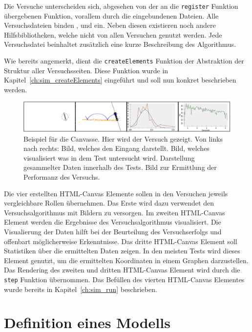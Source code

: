 Die Versuche unterscheiden sich, abgesehen von der an die \lstinline{register} Funktion übergebenen Funktion, vorallem durch die eingebundenen Dateien.
Alle Versuchsdateien binden ,  und  ein.
Neben diesen existieren noch andere Hilfsbibliotheken, welche nicht von allen Versuchen genutzt werden.
Jede Versuchsdatei beinhaltet zusätzlich eine kurze Beschreibung des Algorithmus.

Wie bereits angemerkt, dient die \lstinline{createElements} Funktion der Abstraktion der Struktur aller Versuchsseiten.
Diese Funktion wurde in Kapitel~\ref{ch:sim_createElements} eingeführt und soll nun konkret beschrieben werden.

\begin{figure}
    \includegraphics[width=\textwidth]{gfx/canvasses.png}
    \caption[Bild der Canvasse]{Beispiel für die Canvasse. Hier wird der Versuch  gezeigt. Von links nach rechts: Bild, welches den Eingang darstellt. Bild, welches visualisiert was in dem Test untersucht wird. Darstellung gesammelter Daten innerhalb des Tests. Bild zur Ermittlung der Performanz des Versuchs.}\label{fig:canvasses}
\end{figure}

Die vier erstellten HTML-Canvas Elemente sollen in den Versuchen jeweils vergleichbare Rollen übernehmen.
Das Erste wird dazu verwendet den Versuchsalgorithmus mit Bildern zu versorgen.
Im zweiten HTML-Canvas Element werden die Ergebnisse des Versuchsalgorithmus visualisiert.
Die Visualierung der Daten hilft bei der Beurteilung des Versuchserfolgs und offenbart möglicherweise Erkenntnisse.
Das dritte HTML-Canvas Element soll Statistiken über die ermittelten Daten zeigen.
In den meisten Tests wird dieses Element genutzt, um die ermittelten Koordinaten in einem Graphen darzustellen.
Das Rendering des zweiten und dritten HTML-Canvas Element wird durch die \lstinline{step} Funktion übernommen.
Das Befüllen des vierten HTML-Canvas Elementes wurde bereits in Kapitel~\ref{ch:sim_run} beschrieben.

\section{Definition eines  Modells}

